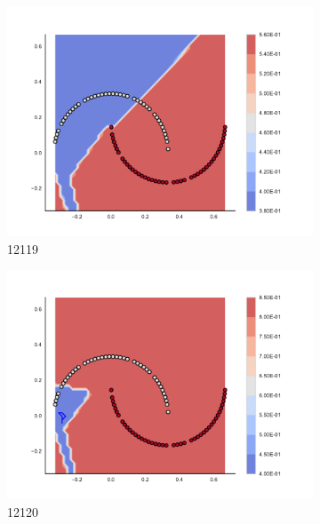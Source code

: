 \begin{figure}[h]
\begin{subfigure}[b]{0.09\textwidth}
    \includegraphics[clip, trim=2.35cm 1.75cm 4.5cm 0cm,width=\textwidth]{img/convergence/12119.pdf}
    \caption{12119}
    \label{fig:convergence_12119}
\end{subfigure}
%
\begin{subfigure}[b]{0.09\textwidth}
    \includegraphics[clip, trim=2.35cm 1.75cm 4.5cm 0cm,width=\textwidth]{img/convergence/12120.pdf}
    \caption{12120}
    \label{fig:convergence_12120}
\end{subfigure}
%
\begin{subfigure}[b]{0.09\textwidth}

\end{subfigure}
\end{figure}
